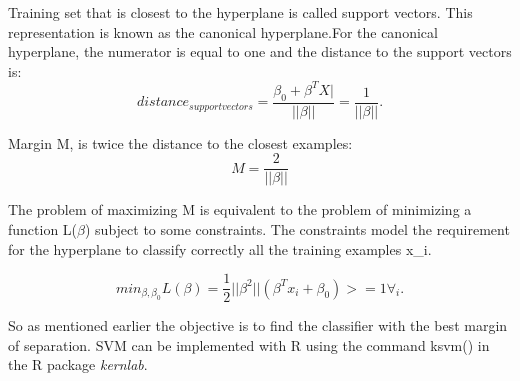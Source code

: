 \documentclass{article}\usepackage[]{graphicx}\usepackage[]{color}
\begin{document}
\par Training set that is closest to the hyperplane is called support vectors. This representation is known as the canonical hyperplane.For the canonical hyperplane, the numerator is equal to one and the distance to the support vectors is:
\hspace{5cm}
\begin{equation} \label{eq:distsv}
distance_{support vectors}=\frac{\beta_0 + \beta^T X|}{||\beta||} = \frac{1}{||\beta||}.
\end{equation}

\par Margin M, is twice the distance to the closest examples:
\hspace{5cm} 
\begin{equation} \label{eq:margin}
M= \frac{2}{||\beta||}
\end{equation}

The problem of maximizing M is equivalent to the problem of minimizing a 
function L($\beta$) subject to some constraints. The constraints model the 
requirement for the hyperplane to classify correctly all the training examples x_{i}.

\hspace{5cm}
\begin{equation} \label{eq:sample}
min_{\beta,\beta_0}L(\beta) = \frac{1}{2} || \beta^2 ||  (\beta^Tx_i + \beta_0)>=1\forall_i.
\end{equation}

So as mentioned earlier the objective is to find the classifier with the best margin of separation. SVM can be implemented with R using the command ksvm() in the R package \textit{kernlab}.
\end{document}
